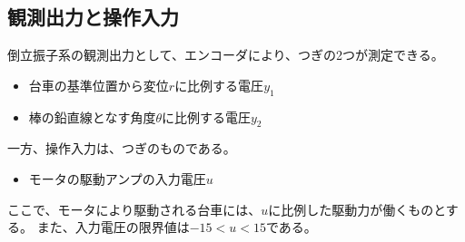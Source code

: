 \subsection{観測出力と操作入力}
倒立振子系の観測出力として、エンコーダにより、つぎの2つが測定できる。\\
\begin{itemize}
  \item 台車の基準位置から変位$r$に比例する電圧$y_{1}$
  \item 棒の鉛直線となす角度$\theta$に比例する電圧$y_{2}$
\end{itemize}
一方、操作入力は、つぎのものである。
\begin{itemize}
  \item モータの駆動アンプの入力電圧$u$
\end{itemize}
ここで、モータにより駆動される台車には、$u$に比例した駆動力が働くものとする。\cite{Koga:Binpe}
また、入力電圧の限界値は$-15<u<15$である。


